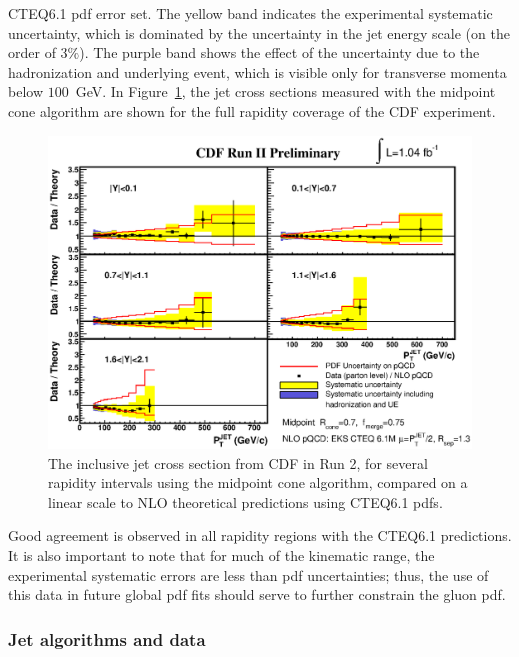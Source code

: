 \documentclass[12pt]{iopart}
\begin{document}
CTEQ6.1 pdf error set. The yellow band indicates the experimental systematic uncertainty, which is dominated by the  uncertainty in
the jet energy scale (on the order of $3\%$). The purple band shows the effect  of the uncertainty due to the hadronization and
underlying event, which is visible only for  transverse momenta below $100$~GeV. In Figure~\ref{fig:cdf_jet_rap}, the jet cross
sections measured with the midpoint cone algorithm are shown for the full rapidity coverage of the CDF experiment.
%
\begin{figure}[t]
\begin{center}
\includegraphics[width=14cm]{sigma_rat_relcor_all.eps}
\end{center}
\vspace*{-0.5cm}
\caption{
The inclusive jet cross section from CDF in Run 2, for several rapidity intervals using the midpoint cone algorithm,
compared on a linear scale to NLO theoretical predictions using CTEQ6.1 pdfs.
\label{fig:cdf_jet_rap}}
\end{figure}
%
Good agreement is observed in all rapidity regions with the CTEQ6.1 predictions. It is also important to note that for much of the
kinematic range, the experimental systematic errors are less than pdf uncertainties; thus, the use of this data in future global pdf
fits should serve to further constrain the gluon pdf. 

\subsubsection{Jet algorithms and data}
\label{sec:jetalgdata}
\end{document}
